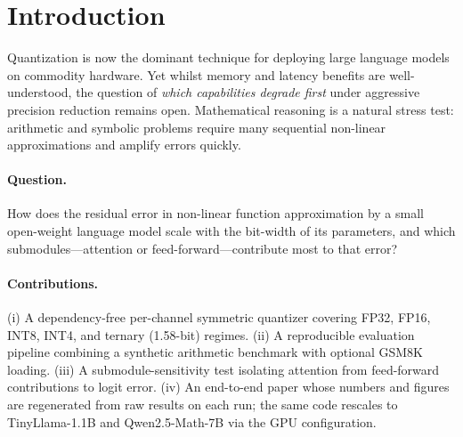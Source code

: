 \section{Introduction}
Quantization is now the dominant technique for deploying large language
models on commodity hardware. Yet whilst memory and latency benefits are
well-understood, the question of \emph{which capabilities degrade first}
under aggressive precision reduction remains open. Mathematical reasoning
is a natural stress test: arithmetic and symbolic problems require many
sequential non-linear approximations and amplify errors quickly.

\paragraph{Question.} How does the residual error in non-linear function
approximation by a small open-weight language model scale with the
bit-width of its parameters, and which submodules---attention or
feed-forward---contribute most to that error?

\paragraph{Contributions.} (i) A dependency-free per-channel symmetric
quantizer covering FP32, FP16, INT8, INT4, and ternary (1.58-bit) regimes.
(ii) A reproducible evaluation pipeline combining a synthetic arithmetic
benchmark with optional GSM8K loading. (iii) A submodule-sensitivity test
isolating attention from feed-forward contributions to logit error. (iv) An
end-to-end paper whose numbers and figures are regenerated from raw results
on each run; the same code rescales to TinyLlama-1.1B and Qwen2.5-Math-7B
via the GPU configuration.
